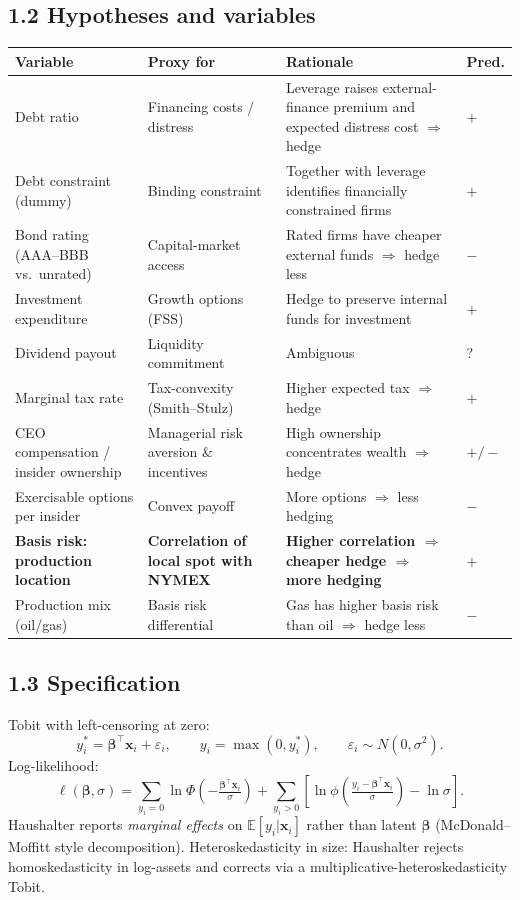\documentclass[11pt]{article}
\newcommand{\EV}{\mathbb{E}}
\begin{document}
\subsection*{1.2 Hypotheses and variables}
\begin{tabular}{p{3.4cm}p{3.8cm}p{4.6cm}p{1.5cm}}
\toprule
\textbf{Variable} & \textbf{Proxy for} & \textbf{Rationale} & \textbf{Pred.} \\
\midrule
Debt ratio & Financing costs / distress & Leverage raises external-finance premium and expected distress cost $\Rightarrow$ hedge & $+$ \\
Debt constraint (dummy) & Binding constraint & Together with leverage identifies financially constrained firms & $+$ \\
Bond rating (AAA--BBB vs.\ unrated) & Capital-market access & Rated firms have cheaper external funds $\Rightarrow$ hedge less & $-$ \\
Investment expenditure & Growth options (FSS) & Hedge to preserve internal funds for investment & $+$ \\
Dividend payout & Liquidity commitment & Ambiguous & ? \\
Marginal tax rate & Tax-convexity (Smith--Stulz) & Higher expected tax $\Rightarrow$ hedge & $+$ \\
CEO compensation / insider ownership & Managerial risk aversion \& incentives & High ownership concentrates wealth $\Rightarrow$ hedge & $+/-$ \\
Exercisable options per insider & Convex payoff & More options $\Rightarrow$ less hedging & $-$ \\
\textbf{Basis risk: production location} & \textbf{Correlation of local spot with NYMEX} & \textbf{Higher correlation $\Rightarrow$ cheaper hedge $\Rightarrow$ more hedging} & $+$ \\
Production mix (oil/gas) & Basis risk differential & Gas has higher basis risk than oil $\Rightarrow$ hedge less & $-$ \\
\bottomrule
\end{tabular}

\subsection*{1.3 Specification}
Tobit with left-censoring at zero:
\[
y_i^* = \bm\beta^\top \mathbf x_i + \varepsilon_i,\qquad y_i=\max(0,y_i^*),\qquad \varepsilon_i\sim N(0,\sigma^2).
\]
Log-likelihood:
\[
\ell(\bm\beta,\sigma)=\sum_{y_i=0}\ln\Phi\!\left(-\tfrac{\bm\beta^\top \mathbf x_i}{\sigma}\right)+\sum_{y_i>0}\left[\ln\phi\!\left(\tfrac{y_i-\bm\beta^\top \mathbf x_i}{\sigma}\right)-\ln\sigma\right].
\]
Haushalter reports \emph{marginal effects} on $\EV[y_i|\mathbf x_i]$ rather than latent $\bm\beta$ (McDonald--Moffitt style decomposition). Heteroskedasticity in size: Haushalter rejects homoskedasticity in log-assets and corrects via a multiplicative-heteroskedasticity Tobit.
\end{document}
